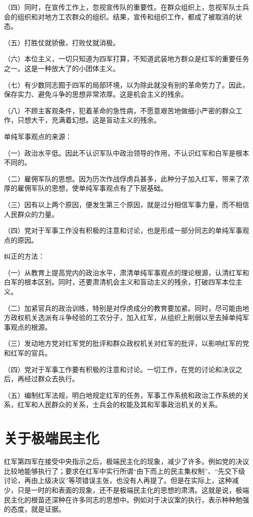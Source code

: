 （四）同时，在宣传工作上，忽视宣传队的重要性。在群众组织上，忽视军队士兵会的组织和对地方工农群众的组织。结果，宣传和组织工作，都成了被取消的状态。

（五）打胜仗就骄傲，打败仗就消极。

（六）本位主义，一切只知道为四军打算，不知道武装地方群众是红军的重要任务之一。这是一种放大了的小团体主义。

（七）有少数同志囿于四军的局部环境，以为除此就没有别的革命势力了。因此，保存实力、避免斗争的思想非常浓厚。这是机会主义的残余。

（八）不顾主客观条件，犯着革命的急性病，不愿意艰苦地做细小严密的群众工作，只想大干，充满着幻想。这是盲动主义的残余。

单纯军事观点的来源：

（一）政治水平低。因此不认识军队中政治领导的作用，不认识红军和白军是根本不同的。

（二）雇佣军队的思想。因为历次作战俘虏兵甚多，此种分子加入红军，带来了浓厚的雇佣军队的思想，使单纯军事观点有了下层基础。

（三）因有以上两个原因，便发生第三个原因，就是过分相信军事力量，而不相信人民群众的力量。

（四）党对于军事工作没有积极的注意和讨论，也是形成一部分同志的单纯军事观点的原因。

纠正的方法：

（一）从教育上提高党内的政治水平，肃清单纯军事观点的理论根源，认清红军和白军的根本区别。同时，还要肃清机会主义和盲动主义的残余，打破四军本位主义。

（二）加紧官兵的政治训练，特别是对俘虏成分的教育要加紧。同时，尽可能由地方政权机关选派有斗争经验的工农分子，加入红军，从组织上削弱以至去掉单纯军事观点的根源。

（三）发动地方党对红军党的批评和群众政权机关对红军的批评，以影响红军的党和红军的官兵。

（四）党对于军事工作要有积极的注意和讨论。一切工作，在党的讨论和决议之后，再经过群众去执行。

（五）编制红军法规，明白地规定红军的任务，军事工作系统和政治工作系统的关系，红军和人民群众的关系，士兵会的权能及其和军事政治机关的关系。

\section{关于极端民主化}

红军第四军在接受中央指示之后，极端民主化的现象，减少了许多。例如党的决议比较地能够执行了；要求在红军中实行所谓“由下而上的民主集权制”、“先交下级讨论，再由上级决议”等项错误主张，也没有人再提了。但是在实际上，这种减少，只是一时的和表面的现象，还不是极端民主化的思想的肃清。这就是说，极端民主化的根苗还深种在许多同志的思想中。例如对于决议案的执行，表示种种勉强的态度，就是证据。

